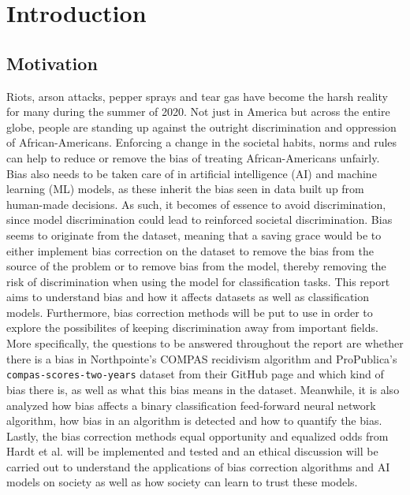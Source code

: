 \documentclass[11pt, fleqn, titlepage]{article}
\begin{document}
	\section{Introduction} \label{indledning}
	
	\subsection{Motivation}
	
	Riots, arson attacks, pepper sprays and tear gas have become the harsh reality for many during the summer of 2020. Not just in America but across the entire globe, people are standing up against the outright discrimination and oppression of African-Americans. \cite{tv2, cnn1, cnn2, euro, guardian} Enforcing a change in the societal habits, norms and rules can help to reduce or remove the bias of treating African-Americans unfairly. Bias also needs to be taken care of in artificial intelligence (AI) and machine learning (ML) models, as these inherit the bias seen in data built up from human-made decisions. As such, it becomes of essence to avoid discrimination, since model discrimination could lead to reinforced societal discrimination. Bias seems to originate from the dataset, meaning that a saving grace would be to either implement bias correction on the dataset to remove the bias from the source of the problem or to remove bias from the model, thereby removing the risk of discrimination when using the model for classification tasks. This report aims to understand bias and how it affects datasets as well as classification models. Furthermore, bias correction methods will be put to use in order to explore the possibilites of keeping discrimination away from important fields. More specifically, the questions to be answered throughout the report are whether there is a bias in Northpointe's COMPAS recidivism algorithm and ProPublica's \texttt{compas-scores-two-years} dataset from their GitHub page and which kind of bias there is, as well as what this bias means in the dataset. Meanwhile, it is also analyzed how bias affects a binary classification feed-forward neural network algorithm, how bias in an algorithm is detected and how to quantify the bias. Lastly, the bias correction methods equal opportunity and equalized odds from Hardt et al. \cite{equal_of_oppor} will be implemented and tested and an ethical discussion will be carried out to understand the applications of bias correction algorithms and AI models on society as well as how society can learn to trust these models. \\
	
\end{document}
